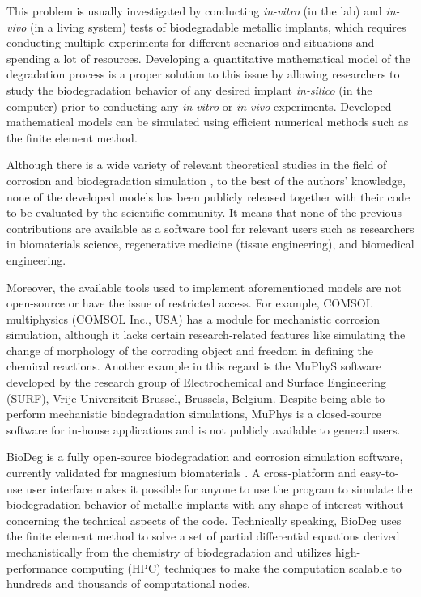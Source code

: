 This problem is usually investigated by conducting \textit{in-vitro} (in the lab) and \textit{in-vivo} (in a living system) tests of biodegradable metallic implants, which requires conducting multiple experiments for different scenarios and situations and spending a lot of resources. Developing a quantitative mathematical model of the degradation process is a proper solution to this issue by allowing researchers to study the biodegradation behavior of any desired implant \textit{in-silico} (in the computer) prior to conducting any \textit{in-vitro} or \textit{in-vivo} experiments. Developed mathematical models can be simulated using efficient numerical methods such as the finite element method.

Although there is a wide variety of relevant theoretical studies in the field of corrosion and biodegradation simulation \cite{Gastaldi2011, Wilder2014, Grogan2014, Bajger2016, Dolgikh2019, Hoche2014, SanzHerrera2018}, to the best of the authors' knowledge, none of the developed models has been publicly released together with their code to be evaluated by the scientific community. It means that none of the previous contributions are available as a software tool for relevant users such as researchers in biomaterials science, regenerative medicine (tissue engineering), and biomedical engineering.

Moreover, the available tools used to implement aforementioned models are not open-source or have the issue of restricted access. For example, COMSOL multiphysics (COMSOL Inc., USA) has a module for mechanistic corrosion simulation, although it lacks certain research-related features like simulating the change of morphology of the corroding object and freedom in defining the chemical reactions. Another example in this regard is the MuPhyS software \cite{Dolgikh2019, Christoph2021} developed by the research group of Electrochemical and Surface Engineering (SURF), Vrije Universiteit Brussel, Brussels, Belgium. Despite being able to perform mechanistic biodegradation simulations, MuPhys is a closed-source software for in-house applications and is not publicly available to general users.

BioDeg is a fully open-source biodegradation and corrosion simulation software, currently validated for magnesium biomaterials \cite{Barzegari2021}. A cross-platform and easy-to-use user interface makes it possible for anyone to use the program to simulate the biodegradation behavior of metallic implants with any shape of interest without concerning the technical aspects of the code. Technically speaking, BioDeg uses the finite element method to solve a set of partial differential equations derived mechanistically from the chemistry of biodegradation and utilizes high-performance computing ({HPC}) techniques to make the computation scalable to hundreds and thousands of computational nodes.


